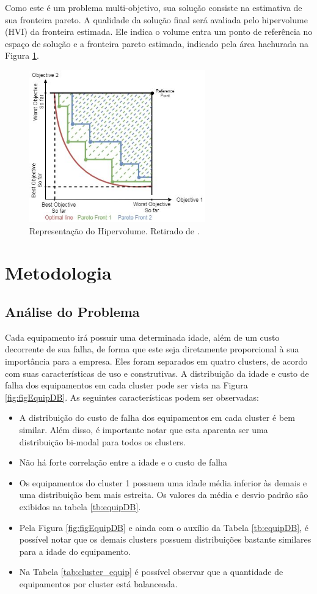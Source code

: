\documentclass[conference]{IEEEtran}
\begin{document}
Como este é um problema multi-objetivo, sua solução consiste na estimativa de sua fronteira pareto. A qualidade da solução final será avaliada pelo hipervolume (HVI) da fronteira estimada. Ele indica o volume entra um ponto de referência no espaço de solução e a fronteira pareto estimada, indicado pela área hachurada na Figura \ref{fig:figHVI}. 

\begin{figure}[h!]
	\centering
	\includegraphics[width=3.0in]{figHVI.jpg}
	\caption{Representação do Hipervolume. Retirado de \cite{HVI:Fatma}.}
	\label{fig:figHVI}
\end{figure}

\section{Metodologia}

\subsection{Análise do Problema}

Cada equipamento irá possuir uma determinada idade, além de um custo decorrente de sua falha, de forma que este seja diretamente proporcional à sua importância para a empresa. Eles foram separados em quatro clusters, de acordo com suas características de uso e construtivas. A distribuição da idade e custo de falha dos equipamentos em cada cluster pode ser vista na Figura \ref{fig:figEquipDB}. As seguintes características podem ser observadas:

\begin{itemize}
	\item A distribuição do custo de falha dos equipamentos em cada cluster é bem similar. Além disso, é importante notar que esta aparenta ser uma distribuição bi-modal para todos os clusters.
	\item Não há forte correlação entre a idade e o custo de falha
	\item Os equipamentos do cluster 1 possuem uma idade média inferior às demais e uma distribuição bem mais estreita. Os valores da média e desvio padrão são exibidos na tabela \ref{tb:equipDB}.
	\item Pela Figura \ref{fig:figEquipDB} e ainda com o auxílio da Tabela \ref{tb:equipDB}, é possível notar que os demais clusters possuem distribuições bastante similares para a idade do equipamento.
	\item Na Tabela \ref{tab:cluster_equip} é possível observar que a quantidade de equipamentos por cluster está balanceada.
\end{itemize}
\end{document}
